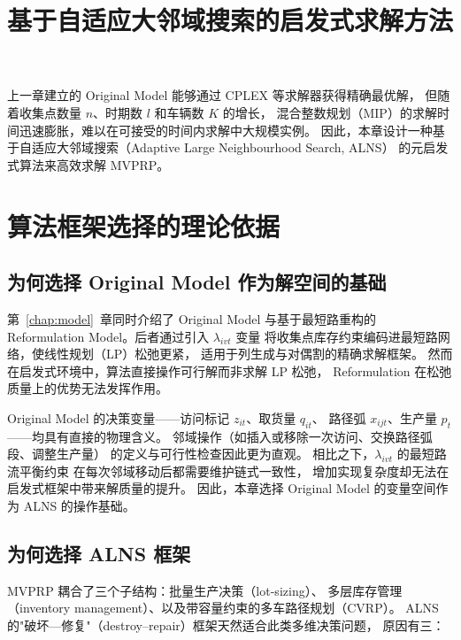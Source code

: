 \documentclass{article}
\begin{document}
\title{基于自适应大邻域搜索的启发式求解方法}
\maketitle  %
\label{chap:alns}

上一章建立的 Original Model 能够通过 CPLEX 等求解器获得精确最优解，
但随着收集点数量 $n$、时期数 $l$ 和车辆数 $K$ 的增长，
混合整数规划（MIP）的求解时间迅速膨胀，难以在可接受的时间内求解中大规模实例。
因此，本章设计一种基于自适应大邻域搜索（Adaptive Large Neighbourhood Search, ALNS）
的元启发式算法来高效求解 MVPRP。

\section{算法框架选择的理论依据}
\label{sec:alns-motivation}

\subsection{为何选择 Original Model 作为解空间的基础}

第~\ref{chap:model}~章同时介绍了 Original Model 与基于最短路重构的
Reformulation Model。后者通过引入 $\lambda_{ivt}$ 变量
将收集点库存约束编码进最短路网络，使线性规划（LP）松弛更紧，
适用于列生成与对偶割的精确求解框架。
然而在启发式环境中，算法直接操作可行解而非求解 LP 松弛，
Reformulation 在松弛质量上的优势无法发挥作用。

Original Model 的决策变量——访问标记 $z_{it}$、取货量 $q_{it}$、
路径弧 $x_{ijt}$、生产量 $p_t$——均具有直接的物理含义。
邻域操作（如插入或移除一次访问、交换路径弧段、调整生产量）
的定义与可行性检查因此更为直观。
相比之下，$\lambda_{ivt}$ 的最短路流平衡约束
在每次邻域移动后都需要维护链式一致性，
增加实现复杂度却无法在启发式框架中带来解质量的提升。
因此，本章选择 Original Model 的变量空间作为 ALNS 的操作基础。

\subsection{为何选择 ALNS 框架}

MVPRP 耦合了三个子结构：批量生产决策（lot-sizing）、
多层库存管理（inventory management）、以及带容量约束的多车路径规划（CVRP）。
ALNS 的"破坏—修复"（destroy–repair）框架天然适合此类多维决策问题，
原因有三：
\end{document}
